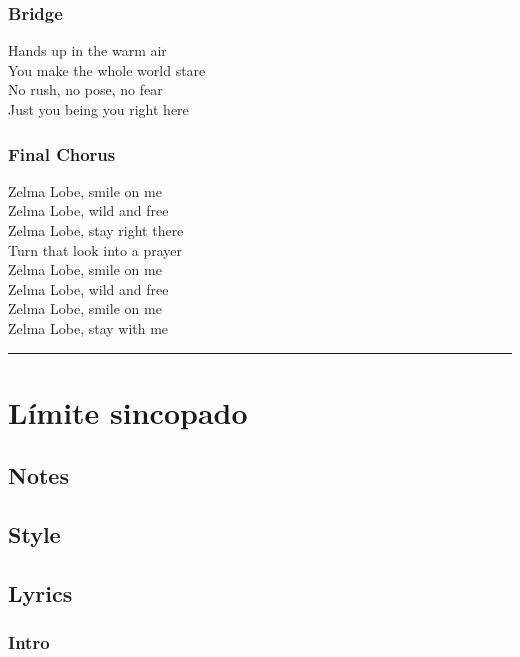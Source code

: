 \subsubsection{Bridge}\label{bridge-21}

Hands up in the warm air\\
You make the whole world stare\\
No rush, no pose, no fear\\
Just you being you right here

\subsubsection{Final Chorus}\label{final-chorus-1}

Zelma Lobe, smile on me\\
Zelma Lobe, wild and free\\
Zelma Lobe, stay right there\\
Turn that look into a prayer\\
Zelma Lobe, smile on me\\
Zelma Lobe, wild and free\\
Zelma Lobe, smile on me\\
Zelma Lobe, stay with me

\begin{center}\rule{0.5\linewidth}{0.5pt}\end{center}

\section{Límite sincopado}\label{luxedmite-sincopado}

\subsection{Notes}\label{notes-44}

\subsection{Style}\label{style-42}

\subsection{Lyrics}\label{lyrics-42}

\subsubsection{Intro}\label{intro-6}

